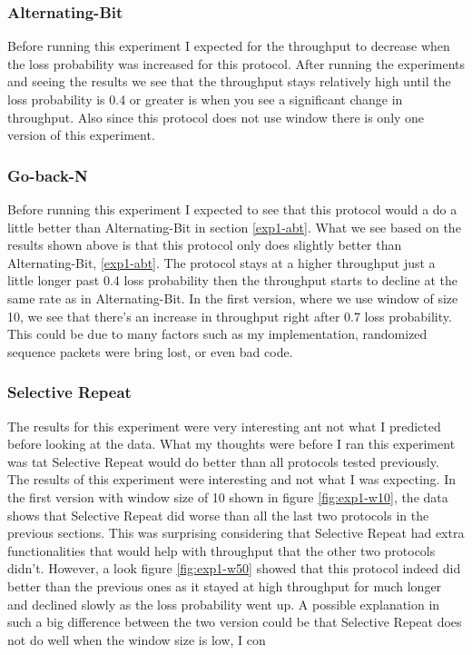 \documentclass[10pt, a4paper]{article}
\begin{document}
    \subsubsection{Alternating-Bit\label{exp1-abt}}
      Before running this experiment I expected for the throughput to decrease when the loss probability was increased for this protocol. After running the experiments and seeing the results we see that the throughput stays relatively high until the loss probability is 0.4 or greater is when you see a significant change in throughput. Also since this protocol does not use window there is only one version of this experiment.
    
    \subsubsection{Go-back-N\label{exp1-gbn}}
        Before running this experiment I expected to see that this protocol would a do a little better than Alternating-Bit in section \ref{exp1-abt}. What we see based on the results shown above is that this protocol only does slightly better than Alternating-Bit, \ref{exp1-abt}. The protocol stays at a higher throughput just a little longer past 0.4 loss probability then the throughput starts to decline at the same rate as in Alternating-Bit. In the first version, where we use window of size 10, we see that there's an increase in throughput right after 0.7 loss probability. This could be due to many factors such as my implementation, randomized sequence packets were bring lost, or even bad code.   
      
    \subsubsection{Selective Repeat\label{exp1-sr}}
    
        The results for this experiment were very interesting ant not what I predicted before looking at the data. What my thoughts were before I ran this experiment was tat Selective Repeat would do better than all protocols tested previously. The results of this experiment were interesting and not what I was expecting. In the first version with window size of 10 shown in figure \ref{fig:exp1-w10}, the data shows that Selective Repeat did worse than all the last two protocols in the previous sections. This was surprising considering that Selective Repeat had extra functionalities that would help with throughput that the other two protocols didn't. However, a look figure \ref{fig:exp1-w50} showed that this protocol indeed did better than the previous ones as it stayed at high throughput for much longer and declined slowly as the loss probability went up. A possible explanation in such a big difference between the two version could be that Selective Repeat does not do well when the window size is low, I con
    
\end{document}
